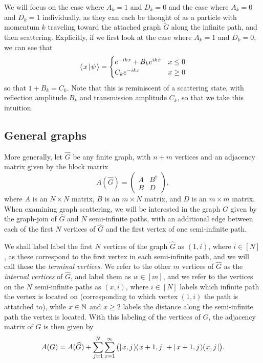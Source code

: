 \documentclass[../thesis-main/thesis-main]{subfiles}
\begin{document}
We will focus on the case where $A_k = 1$ and $D_k=0$ and the case where $A_k = 0$ and $D_k=1$ individually, as they can each be thought of as a particle with momentum $k$ traveling toward the attached graph $\widetilde{G}$ along the infinite path, and then scattering.  Explicitly, if we first look at the case where $A_k = 1$ and $D_k = 0$,  we can see that
\begin{align}
  \langle\mspace{2mu} x \mspace{2mu} | \mspace{2mu} \psi\mspace{2mu} \rangle = \begin{cases} e^{-ikx} + B_k e^{i kx} & x\leq 0\\
  C_k e^{-ikx} & x \geq 0\end{cases}
\end{align}
so that $1+ B_k  =C_k$.  Note that this is reminiscent of a scattering state, with reflection amplitude $B_k$ and transmission amplitude $C_k$, so that we take this intuition.  





\subsection{General graphs}


More generally, let $\widehat{G}$ be any finite graph, with $n+m$ vertices and an adjacency matrix given by the block matrix
\begin{equation}
  A(\widehat{G}) = \begin{pmatrix}A & B^\dag\\ B & D\end{pmatrix},
\end{equation}
where $A$ is an $N\times N$ matrix, $B$ is an $m\times N$ matrix, and $D$ is an $m\times m$ matrix.  When examining graph scattering, we will be interested in the graph $G$ given by the graph-join of $\widehat{G}$ and $N$ semi-infinite paths, with an additional edge between each of the first $N$ vertices of $\widehat{G}$ and the first vertex of one semi-infinite path.  

We shall label label the first $N$ vertices of the graph $\widehat{G}$ as $(1,i)$, where $i\in[N]$, as these correspond to the first vertex in each semi-infinite path, and we will call these the \textit{terminal vertices}.  We refer to the other $m$ vertices of $\widehat{G}$ as the \textit{internal vertices} of $\widehat{G}$, and label them as $w\in[m]$, and we refer to the vertices on the $N$ semi-infinite paths as $(x,i)$, where $i\in[N]$ labels which infinite path the vertex is located on (corresponding to which vertex $(1,i)$ the path is attatched to), while $x\in \mathbb{N}$ and $x\geq 2$ labels the distance along the semi-infinite path the vertex is located.  With this labeling of the vertices of $G$, the adjacency matrix of $G$ is then given by
\begin{equation}
  A(G) = A(\widehat{G}) + \sum_{j=1}^N \sum_{x=1}^\infty \big(|\mspace{2mu} x,j \mspace{2mu} \rangle\mspace{-2mu}\langle\mspace{2mu} x+1,j \mspace{2mu} | + |\mspace{2mu} x+1,j \mspace{2mu} \rangle\mspace{-2mu}\langle\mspace{2mu} x,j \mspace{2mu} |\big).
\end{equation}
\end{document}
